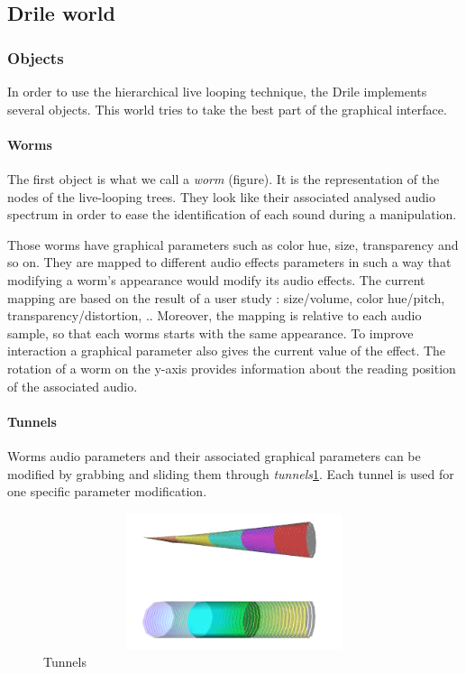 \subsection{Drile world} 
 \subsubsection{Objects}
 In order to use the hierarchical live looping technique, the Drile implements several objects. This world tries to take the best part of the graphical interface.
\paragraph{Worms}    
 The first object is what we call a \textit{worm} (figure). It is the representation of the nodes of the live-looping trees. They look like their associated analysed audio spectrum in order to ease the identification of each sound during a manipulation.
  
Those worms have graphical parameters such as color hue, size, transparency and so on. They are mapped to different audio effects parameters in such a way that modifying a worm's appearance would modify its audio effects. The current mapping are based on the result of a user study : size/volume, color hue/pitch, transparency/distortion, .. Moreover, the mapping is relative to each audio sample, so that each worms starts with the same appearance. To improve interaction a graphical parameter also gives the current value of the effect. The rotation of a worm on the y-axis provides information about the reading position of the associated audio.

\paragraph{Tunnels}    
Worms audio parameters and their associated graphical parameters can be modified by grabbing and sliding them through \textit{tunnels}\ref{fig:tunnel}. Each tunnel is used for one specific parameter modification.

\begin{figure}[h!]
\centering\includegraphics[width=14cm,height=4cm]{image/tunnels.png}
\caption{Tunnels}
\label{fig:tunnel}
\end{figure} 


